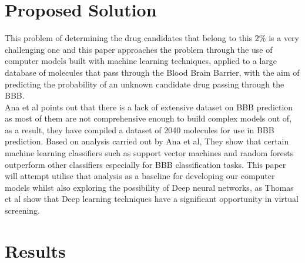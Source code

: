 \documentclass[a4paper,12pt]{report}
\begin{document}
	\section{Proposed Solution}
		This problem of determining the drug candidates that belong to this 2\% is a very challenging one and this paper approaches the problem through the use of computer models built with machine learning techniques, applied to a large database of molecules that pass through the Blood Brain Barrier, with the aim of predicting the probability of an unknown candidate drug passing through the BBB. \\
		Ana et al \cite{Anaetal2012} points out that there is a lack of extensive dataset on BBB prediction as most of them are not comprehensive enough to build complex models out of, as a result, they have compiled a dataset of 2040 molecules for use in BBB prediction. Based on analysis carried out \cite{Anaetal2012} by Ana et al, They show that certain machine learning classifiers such as support vector machines and random forests outperform other classifiers especially for BBB classification tasks. This paper will attempt utilise that analysis as a baseline for developing our computer models whilst also exploring the possibility of Deep neural networks, as Thomas et al \cite{Thomasetal2014} show that Deep learning techniques have a significant opportunity in virtual screening.
	\section{Results}
\end{document}
